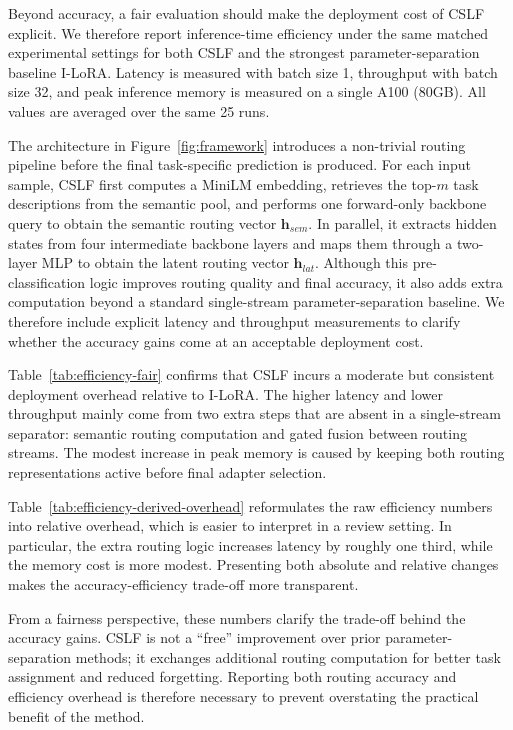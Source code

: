 \documentclass[11pt]{article}
\begin{document}
Beyond accuracy, a fair evaluation should make the deployment cost of CSLF explicit. We therefore report inference-time efficiency under the same matched experimental settings for both CSLF and the strongest parameter-separation baseline I-LoRA. Latency is measured with batch size 1, throughput with batch size 32, and peak inference memory is measured on a single A100 (80GB). All values are averaged over the same 25 runs.

The architecture in Figure~\ref{fig:framework} introduces a non-trivial routing pipeline before the final task-specific prediction is produced. For each input sample, CSLF first computes a MiniLM embedding, retrieves the top-$m$ task descriptions from the semantic pool, and performs one forward-only backbone query to obtain the semantic routing vector $\mathbf{h}_{sem}$. In parallel, it extracts hidden states from four intermediate backbone layers and maps them through a two-layer MLP to obtain the latent routing vector $\mathbf{h}_{lat}$. Although this pre-classification logic improves routing quality and final accuracy, it also adds extra computation beyond a standard single-stream parameter-separation baseline. We therefore include explicit latency and throughput measurements to clarify whether the accuracy gains come at an acceptable deployment cost.



Table~\ref{tab:efficiency-fair} confirms that CSLF incurs a moderate but consistent deployment overhead relative to I-LoRA. The higher latency and lower throughput mainly come from two extra steps that are absent in a single-stream separator: semantic routing computation and gated fusion between routing streams. The modest increase in peak memory is caused by keeping both routing representations active before final adapter selection.



Table~\ref{tab:efficiency-derived-overhead} reformulates the raw efficiency numbers into relative overhead, which is easier to interpret in a review setting. In particular, the extra routing logic increases latency by roughly one third, while the memory cost is more modest. Presenting both absolute and relative changes makes the accuracy-efficiency trade-off more transparent.

From a fairness perspective, these numbers clarify the trade-off behind the accuracy gains. CSLF is not a ``free'' improvement over prior parameter-separation methods; it exchanges additional routing computation for better task assignment and reduced forgetting. Reporting both routing accuracy and efficiency overhead is therefore necessary to prevent overstating the practical benefit of the method.
\end{document}
